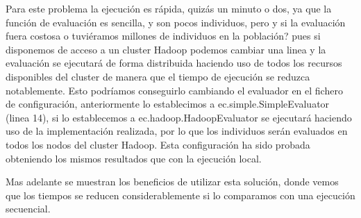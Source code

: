 Para este problema la ejecuci\'on es rápida, quizás un minuto o dos, ya que la función de evaluación es sencilla, y son pocos individuos, pero y si la evaluación fuera costosa o tuviéramos millones de individuos en la población? pues si disponemos de acceso a un cluster Hadoop podemos cambiar una linea y la evaluación se ejecutar\'a de forma distribuida haciendo uso de todos los recursos disponibles del cluster de manera que el tiempo de ejecución se reduzca notablemente. Esto podríamos conseguirlo cambiando el evaluador en el fichero de configuración, anteriormente lo establecimos a ec.simple.SimpleEvaluator (linea 14), si lo establecemos a ec.hadoop.HadoopEvaluator se ejecutar\'a haciendo uso de la implementación realizada, por lo que los individuos serán evaluados en todos los nodos del cluster Hadoop. Esta configuraci\'on ha sido probada obteniendo los mismos resultados que con la ejecución local.

Mas adelante  se muestran los beneficios de utilizar esta solución, donde vemos que los tiempos se reducen considerablemente si lo comparamos con una ejecución secuencial.



















